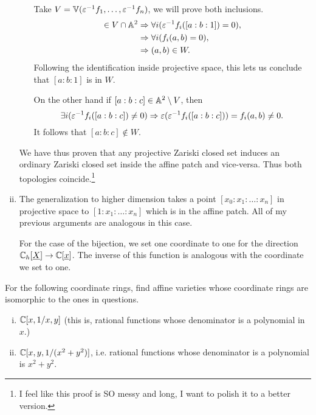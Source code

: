 \documentclass[12pt]{memoir}
\begin{document}
\begin{ptcbr}
\begin{enumerate}[i)]
\begin{enumerate}
        Take $V=\mathbb{V}(\varepsilon^{-1}f_1,\dots,\varepsilon^{-1}f_n)$, we will prove both inclusions.
        \begin{align*}
          [a:b:c]\in V\cap\bA^2&\To\forall i(\eps^{-1}f_i([a:b:1])=0),\\
          &\To\forall i(f_i(a,b)=0),\\
          &\To(a,b)\in W.
        \end{align*}
        Following the identification inside projective space, this lets us conclude that $[a:b:1]$ is in $W$.\par 
        On the other hand if $[a:b:c]\in\mathbb{A}^2\setminus V$, then 
        $$\exists i(\varepsilon^{-1} f_i([a:b:c])\neq 0)\Rightarrow \varepsilon(\varepsilon^{-1}f_i([a:b:c]))=f_i(a,b)\neq 0.$$
        It follows that $[a:b:c]\not\in W$.
      \end{enumerate}
      We have thus proven that any projective Zariski closed set induces an ordinary Zariski closed set inside the affine patch and vice-versa. Thus both topologies coincide.\footnote{I feel like this proof is SO messy and long, I want to polish it to a better version.}
      
    \item The generalization to higher dimension takes a point $[x_0:x_1:\dots:x_n]$ in projective space to $[1:x_1:\dots:x_n]$ which is in the affine patch. All of my previous arguments are analogous in this case.\par 
    For the case of the bijection, we set one coordinate to one for the direction $\mathbb{C}_h[\underline{X}]\to\mathbb{C}[\underline{x}]$. The inverse of this function is analogous with the coordinate we set to one.
    \end{enumerate}
    
  \end{ptcbr}
\newpage
  \begin{Ej}
    For the following coordinate rings, find affine varieties whose coordinate rings are isomorphic to the ones in questions.
    \begin{enumerate}[i)]
      \itemsep=-0.4em
      \item $\mathbb{C}[x,1/x,y]$ (this is, rational functions whose denominator is a polynomial in $x$.) 
      \item $\mathbb{C}[x,y,1/(x^2+y^2)]$, i.e. rational functions whose denominator is a polynomial is $x^2+y^2$.
    \end{enumerate}
  \end{Ej}
\end{document}
